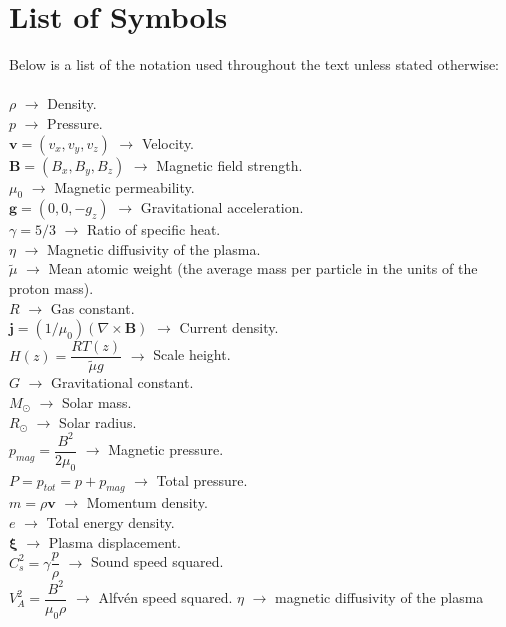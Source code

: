 \documentclass[12pt]{ociamthesis}
\newcommand{\Alfven}{Alfv\'{e}n }
\begin{document}
\baselineskip=18pt

\setcounter{secnumdepth}{3}
\setcounter{tocdepth}{3}

\section*{List of Symbols}
Below is a list of the notation used throughout the text unless stated otherwise: \\ \\
$\rho$ $\rightarrow$ Density.  \\
$p$ $\rightarrow$ Pressure. \\
$\boldsymbol{v} = (v_x, v_y, v_z)$ $\rightarrow$ Velocity.  \\
$\boldsymbol{B} = (B_x,B_y,B_z)$ $\rightarrow$ Magnetic field strength. \\
$\mu_0$ $\rightarrow$ Magnetic permeability. \\
$\boldsymbol{g} = (0,0,-g_z)$ $\rightarrow$ Gravitational acceleration. \\
$\gamma = 5/3$ $\rightarrow$ Ratio of specific heat. \\
$\eta$ $\rightarrow$ Magnetic diffusivity of the plasma. \\
$\widetilde{\mu}$ $\rightarrow$ Mean atomic weight (the average mass per particle in the units of the proton mass).  \\
$R$ $\rightarrow$ Gas constant.\\
$\boldsymbol{j} = (1 / \mu_0) (\nabla \times \boldsymbol{B})$ $\rightarrow$ Current density.  \\
$H(z) = \dfrac{R T(z)}{\widetilde{\mu} g}$ $\rightarrow$ Scale height.  \\
$G$ $\rightarrow$ Gravitational constant. \\
$M_{\odot}$ $\rightarrow$ Solar mass. \\
$R_{\odot}$ $\rightarrow$ Solar radius. \\
$p_{mag} = \dfrac{B^2}{2 \mu_0} $ $\rightarrow$ Magnetic pressure. \\
$P=p_{tot} = p + p_{mag} $ $\rightarrow$ Total pressure. \\
$m = \rho \boldsymbol{v}$ $\rightarrow$ Momentum density. \\
$e$ $\rightarrow$ Total energy density. \\ 
$\boldsymbol{\xi}$ $\rightarrow$ Plasma displacement. \\
$C^2_s = \gamma \dfrac{p}{\rho}$ $\rightarrow$ Sound speed squared. \\ 
$V_A^2=\dfrac{B^2}{\mu_0 \rho}$ $\rightarrow$ \Alfven speed squared. 
$\eta$ $\rightarrow$ magnetic diffusivity of the plasma
\clearpage
\setcounter{page}{1}
\end{document}
